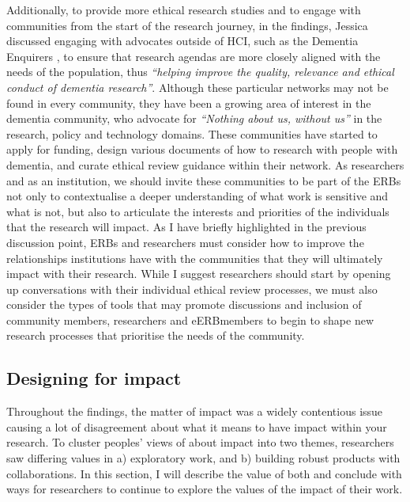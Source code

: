Additionally, to provide more ethical research studies and to engage with communities from the start of the research journey, in the findings, Jessica discussed engaging with advocates outside of HCI, such as the Dementia Enquirers \cite{davies2021dementia}, to ensure that research agendas are more closely aligned with the needs of the population, thus \textit{``helping improve the quality, relevance and ethical conduct of dementia research''}. Although these particular networks may not be found in every community, they have been a growing area of interest in the dementia community, who advocate for \textit{``Nothing about us, without us''} \citep{spiel_nothing_2020} in the research, policy and technology domains. These communities have started to apply for funding, design various documents of how to research with people with dementia, and curate ethical review guidance within their network. As researchers and as an institution, we should invite these communities to be part of the ERBs not only to contextualise a deeper understanding of what work is sensitive and what is not, but also to articulate the interests and priorities of the individuals that the research will impact. As I have briefly highlighted in the previous discussion point, ERBs and researchers must consider how to improve the relationships institutions have with the communities that they will ultimately impact with their research. While I suggest researchers should start by opening up conversations with their individual ethical review processes, we must also consider the types of tools that may promote discussions and inclusion of community members, researchers and eERBmembers to begin to shape new research processes that prioritise the needs of the community. 

\subsection{Designing for impact}
\label{Discussion:Impact}
Throughout the findings, the matter of impact was a widely contentious issue causing a lot of disagreement about what it means to have impact within your research. To cluster peoples' views of about impact into two themes, researchers saw differing values in a) exploratory work, and b) building robust products with collaborations. In this section, I will describe the value of both and conclude with ways for researchers to continue to explore the values of the impact of their work. 

